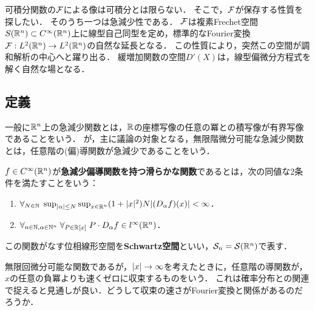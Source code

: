\documentclass[uplatex,dvipdfmx]{jsreport}
\begin{document}
\begin{tcolorbox}[colframe=ForestGreen, colback=ForestGreen!10!white,breakable,colbacktitle=ForestGreen!40!white,coltitle=black,fonttitle=\bfseries\sffamily,
title=]
    可積分関数の$\mathcal{F}$による像は可積分とは限らない．
    そこで，$\mathcal{F}$が保存する性質を探したい．
    そのうち一つは急減少性である．
    $\mathcal{F}$は複素Frechet空間$S(\mathbb{R}^n)\subset C^\infty(\mathbb{R}^n)$上に線型自己同型を定め，標準的なFourier変換$\mathcal{F}:L^2(\mathbb{R}^n)\to L^2(\mathbb{R}^n)$の自然な延長となる．
    この性質により，突然この空間が調和解析の中心へと躍り出る．
    緩増加関数の空間$D'(X)$は，線型偏微分方程式を解く自然な場となる．
\end{tcolorbox}

\subsection{定義}

\begin{tcolorbox}[colframe=ForestGreen, colback=ForestGreen!10!white,breakable,colbacktitle=ForestGreen!40!white,coltitle=black,fonttitle=\bfseries\sffamily,
title=]
    一般に$\mathbb{R}^n$上の急減少関数とは，$\mathbb{R}$の座標写像の任意の冪との積写像が有界写像であることをいう．
    が，主に議論の対象となる，無限階微分可能な急減少関数とは，任意階の(偏)導関数が急減少であることをいう．
\end{tcolorbox}

\begin{definition}
    $f\in C^\infty(\mathbb{R}^n)$が\textbf{急減少偏導関数を持つ滑らかな関数}であるとは，次の同値な2条件を満たすことをいう：
    \begin{enumerate}
        \item $\forall_{N\in\mathbb{N}}\;\sup_{\lvert\alpha\rvert\le N}\sup_{x\in\mathbb{R}^n}(1+\lvert x\rvert^2)N\lvert(D_\alpha f)(x)\rvert<\infty$．
        \item $\forall_{n\in\mathbb{N},\alpha\in\mathbb{N}^n}\;\forall_{P\in\mathbb{R}[x]}\;P\cdot D_\alpha f\in l^\infty(\mathbb{R}^n)$．
    \end{enumerate}
    この関数がなす位相線形空間を\textbf{Schwartz空間}といい，$\mathcal{S}_n=\mathcal{S}(\mathbb{R}^n)$で表す．
\end{definition}
\begin{remarks}
    無限回微分可能な関数であるが，$\lvert x\rvert\to\infty$を考えたときに，任意階の導関数が，$x$の任意の負冪よりも速くゼロに収束するものをいう．
    これは確率分布との関連で捉えると見通しが良い．どうして収束の速さがFourier変換と関係があるのだろうか．
\end{remarks}
\end{document}
